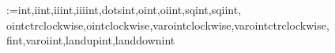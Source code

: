 
\let\oldforall\forall %
\renewcommand{\forall}{\;\oldforall\;}

\makeatletter
\@for\next:={int,iint,iiint,iiiint,dotsint,oint,oiint,sqint,sqiint,
  ointctrclockwise,ointclockwise,varointclockwise,varointctrclockwise,
  fint,varoiint,landupint,landdownint}\do{%
    \expandafter\edef\csname\next\endcsname{%
      \noexpand\DOTSI
      \expandafter\noexpand\csname\next op\endcsname
      \noexpand\ilimits@
    }%
  }
\makeatother

\usepackage{ifluatex} %
\ifluatex
    \usepackage{luacolor} %
    \usepackage[soul]{lua-ul} %
\fi
\newcommand{\obs}[1]{\textcolor{red}{(#1)}} %
\newcommand{\secret}[1]{\makebox[0cm]{}} %
\newcommand{\sizecorr}[1]{\makebox[0cm]{\phantom{$\displaystyle #1$}}} %
